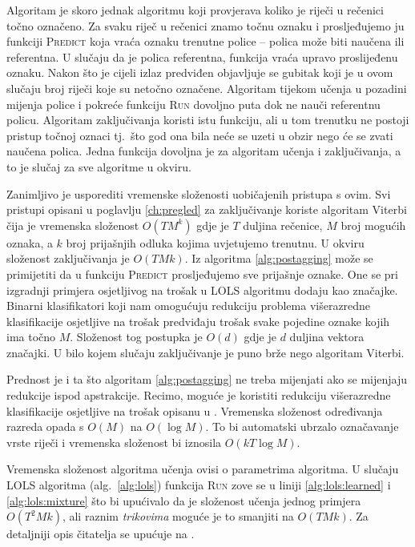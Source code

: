 Algoritam je skoro jednak algoritmu koji provjerava koliko je riječi u rečenici
točno označeno. Za svaku riječ u rečenici znamo točnu oznaku i prosljeđujemo ju
funkciji \textsc{Predict} koja vraća oznaku trenutne police -- polica može biti
naučena ili referentna. U slučaju da je polica referentna, funkcija vraća upravo
proslijeđenu oznaku. Nakon što je cijeli izlaz predviđen objavljuje se gubitak
koji je u ovom slučaju broj riječi koje su netočno označene. Algoritam tijekom
učenja u pozadini mijenja police i pokreće funkciju \textsc{Run} dovoljno puta
dok ne nauči referentnu policu. Algoritam zaključivanja koristi istu funkciju,
ali u tom trenutku ne postoji pristup točnoj oznaci tj.~što god ona bila neće se
uzeti u obzir nego će se zvati naučena polica. Jedna funkcija dovoljna je za
algoritam učenja i zaključivanja, a to je slučaj za sve algoritme u \lts{}
okviru.

Zanimljivo je usporediti vremenske složenosti uobičajenih pristupa s ovim. Svi
pristupi opisani u poglavlju \ref{ch:pregled} za zaključivanje koriste algoritam
Viterbi čija je vremenska složenost $O(T M ^ k)$ gdje je $T$ duljina rečenice,
$M$ broj mogućih oznaka, a $k$ broj prijašnjih odluka kojima uvjetujemo
trenutnu. U \lts{} okviru složenost zaključivanja je $O(T M k)$. Iz algoritma
\ref{alg:postagging} može se primijetiti da u funkciju \textsc{Predict}
prosljeđujemo  sve prijašnje oznake. One se pri izgradnji primjera osjetljivog
na trošak u \textsc{LOLS} algoritmu dodaju kao značajke. Binarni klasifikatori
koji nam omogućuju redukciju problema višerazredne klasifikacije osjetljive na
trošak predviđaju trošak svake pojedine oznake kojih ima točno $M$. Složenost
tog postupka je $O(d)$ gdje je $d$ duljina vektora značajki. U bilo kojem
slučaju zaključivanje je puno brže nego algoritam Viterbi.

Prednost je i ta što algoritam \ref{alg:postagging} ne treba mijenjati ako se
mijenjaju redukcije ispod apstrakcije. Recimo, moguće je koristiti redukciju
višerazredne klasifikacije osjetljive na trošak opisanu u
\citep{beygelzimer2009error, daume2016one}. Vremenska složenost određivanja
razreda opada s $O(M)$ na $O(\log M)$. To bi automatski ubrzalo označavanje
vrste riječi i vremenska složenost bi iznosila $O(k T \log M)$.

Vremenska složenost algoritma učenja ovisi o parametrima algoritma. U slučaju
\textsc{LOLS} algoritma (alg.~\ref{alg:lols}) funkcija \textsc{Run} zove se u
liniji \ref{alg:lols:learned} i \ref{alg:lols:mixture} što bi upućivalo da je
složenost učenja jednog primjera $O(T ^ 2 M k)$, ali raznim \textit{trikovima}
moguće je to smanjiti na $O(T M k)$. Za detaljniji opis čitatelja se upućuje na
\citep{daume14lts}.

